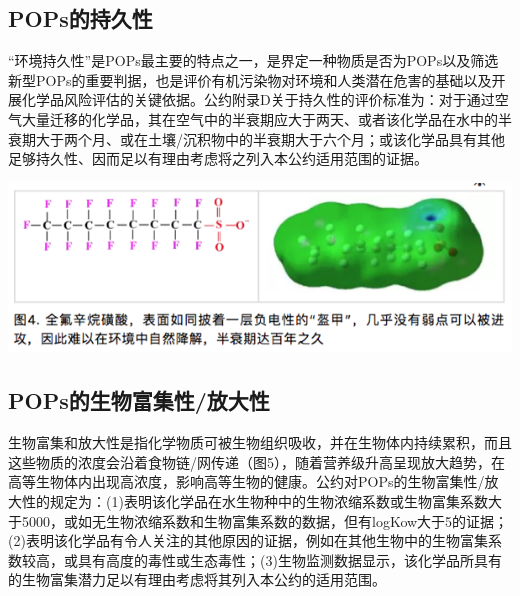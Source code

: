 \documentclass[]{book}
\begin{document}
\hypertarget{popsux7684ux6301ux4e45ux6027}{%
\subsection{POPs的持久性}\label{popsux7684ux6301ux4e45ux6027}}

``环境持久性''是POPs最主要的特点之一，是界定一种物质是否为POPs以及筛选新型POPs的重要判据，也是评价有机污染物对环境和人类潜在危害的基础以及开展化学品风险评估的关键依据。公约附录D关于持久性的评价标准为：对于通过空气大量迁移的化学品，其在空气中的半衰期应大于两天、或者该化学品在水中的半衰期大于两个月、或在土壤/沉积物中的半衰期大于六个月；或该化学品具有其他足够持久性、因而足以有理由考虑将之列入本公约适用范围的证据。

\includegraphics[width=8.33in]{images/gongyue4}

\hypertarget{popsux7684ux751fux7269ux5bccux96c6ux6027ux653eux5927ux6027}{%
\subsection{POPs的生物富集性/放大性}\label{popsux7684ux751fux7269ux5bccux96c6ux6027ux653eux5927ux6027}}

生物富集和放大性是指化学物质可被生物组织吸收，并在生物体内持续累积，而且这些物质的浓度会沿着食物链/网传递（图5），随着营养级升高呈现放大趋势，在高等生物体内出现高浓度，影响高等生物的健康。公约对POPs的生物富集性/放大性的规定为：(1)表明该化学品在水生物种中的生物浓缩系数或生物富集系数大于5000，或如无生物浓缩系数和生物富集系数的数据，但有logKow大于5的证据；(2)表明该化学品有令人关注的其他原因的证据，例如在其他生物中的生物富集系数较高，或具有高度的毒性或生态毒性；(3)生物监测数据显示，该化学品所具有的生物富集潜力足以有理由考虑将其列入本公约的适用范围。
\end{document}
